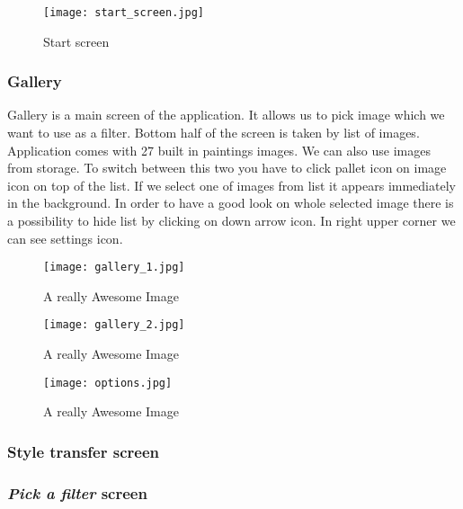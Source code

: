 \documentclass[../Main.tex]{subfiles}
\begin{document}
\begin{figure}[H]
    \centering
    \texttt{[image: start\_screen.jpg]}
    \caption{Start screen}
    \label{fig:start-screen}
\end{figure}


\subsubsection{Gallery}
Gallery is a main screen of the application. It allows us to pick image 
which we want to use as a filter. Bottom half of the screen is taken by list of images.
Application comes with 27 built in paintings images. We can also use images from storage.
To switch between this two you have to click pallet icon on image icon on top of the list.
If we select one of images from list it appears immediately in the background.
In order to have a good look on whole selected image there is a possibility 
to hide list by clicking on down arrow icon. 
In right upper corner we can see settings icon. 

\begin{figure}[H]
        \texttt{[image: gallery\_1.jpg]}
        \caption{A really Awesome Image}\label{fig:awesome_image1}
    \endminipage\hfill
        \texttt{[image: gallery\_2.jpg]}
        \caption{A really Awesome Image}\label{fig:awesome_image2}
    \endminipage\hfill
        \texttt{[image: options.jpg]}
        \caption{A really Awesome Image}\label{fig:awesome_image2}
    \endminipage\hfill
\end{figure}

\subsubsection{Style transfer screen}

\subsubsection{\textit{Pick a filter} screen}
\end{document}
